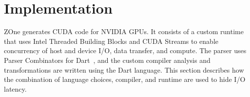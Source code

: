 \section{Implementation}

ZOne generates CUDA code for NVIDIA GPUs.
It consists of a custom
runtime that uses Intel Threaded Building Blocks and CUDA Streams to enable
concurrency of host and device I/O, data transfer, and compute. The parser
uses Parser Combinators for Dart~\cite{dartparsers}, and the custom compiler
analysis and transformations are written using the Dart language.
This section describes how the combination of language choices, compiler, and runtime are used to hide I/O latency.





